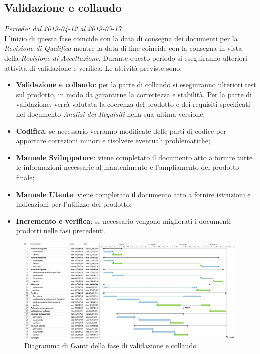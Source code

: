 \subsection{Validazione e collaudo}
\textit{Periodo: dal 2019-04-12 al 2019-05-17 } \\
L'inizio di questa fase coincide con la data di consegna dei documenti per la 
\textit{Revisione di Qualifica} mentre la data di fine coincide con la 
consegna in vista della \textit{Revisione di Accettazione}. Durante questo periodo 
si eseguiranno ulteriori attività di validazione e verifica. Le attività 
previste sono: 
\begin{itemize}	
	\item \textbf{Validazione e collaudo}: per la parte di collaudo si 
	eseguiranno ulteriori test sul prodotto, in modo da garantirne la 
	correttezza e stabilità. Per la parte di validazione, verrà 
	valutata la coerenza del prodotto e dei requisiti specificati nel documento 
	\textit{Analisi dei Requisiti} nella sua ultima versione;
	\item \textbf{Codifica}: se necessario verranno modificate delle parti di 
	codice per apportare correzioni minori e risolvere eventuali problematiche;
	\item \textbf{Manuale Sviluppatore}: viene completato il documento atto a fornire
	tutte le informazioni necessarie al mantenimento e l'ampliamento del prodotto finale;
	\item \textbf{Manuale Utente}: viene completato il documento atto a fornire 
	istruzioni e indicazioni per l'utilizzo del prodotto;
	\item \textbf{Incremento e verifica}: se necessario vengono migliorati i 
	documenti prodotti nelle fasi precedenti.
	
\end{itemize}
\begin{figure}[H]
	\includegraphics[width=0.99\linewidth]{res/images/gantt_val.jpg}
	\caption{Diagramma di Gantt della fase di validazione e collaudo}
\end{figure}

